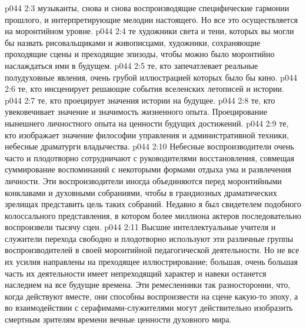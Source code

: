 \vs p044 2:3 \bibnobreakspace {} музыканты, снова и снова воспроизводящие специфические гармонии прошлого, и интерпретирующие мелодии настоящего. Но все это осуществляется на моронтийном уровне.
\vs p044 2:4 \pc {}\bibnobreakspace {} те художники света и тени, которых вы могли бы назвать рисовальщиками и живописцами, художники, сохраняющие проходящие сцены и преходящие эпизоды, чтобы можно было моронтийно наслаждаться ими в будущем.
\vs p044 2:5 \pc {}\bibnobreakspace {} те, кто запечатлевает реальные полудуховные явления, очень грубой иллюстрацией которых было бы кино.
\vs p044 2:6 \pc {}\bibnobreakspace {} те, кто инсценирует решающие события вселенских летописей и истории.
\vs p044 2:7 \pc {}\bibnobreakspace {} те, кто проецирует значения истории на будущее.
\vs p044 2:8 \pc {}\bibnobreakspace {} те, кто увековечивает значение и значимость жизненного опыта. Проецирование нынешнего личностного опыта на ценности будущих достижений.
\vs p044 2:9 \pc {}\bibnobreakspace {} те, кто изображает значение философии управления и административной техники, небесные драматурги владычества.
\vs p044 2:10 \pc Небесные воспроизводители очень часто и плодотворно сотрудничают с руководителями восстановления, совмещая суммирование воспоминаний с некоторыми формами отдыха ума и развлечения личности. Эти воспроизводители иногда объединяются перед моронтийными конклавами и духовными собраниями, чтобы в грандиозных драматических зрелищах представить цель таких собраний. Недавно я был свидетелем подобного колоссального представления, в котором более миллиона актеров последовательно воспроизвели тысячу сцен.
\vs p044 2:11 Высшие интеллектуальные учителя и служители перехода свободно и плодотворно используют эти различные группы воспроизводителей в своей моронтийной педагогической деятельности. Но не все их усилия направлены на преходящее иллюстрирование; большая, очень большая часть их деятельности имеет непреходящий характер и навеки останется наследием на все будущие времена. Эти ремесленники так разносторонни, что, когда действуют вместе, они способны воспроизвести на сцене какую\hyp{}то эпоху, а во взаимодействии с серафимами\hyp{}служителями могут действительно изобразить смертным зрителям времени вечные ценности духовного мира.

